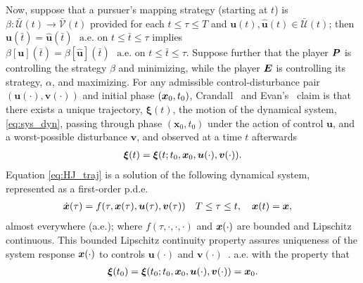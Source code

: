Now, suppose that a pursuer's mapping strategy (starting at $t$) is $\beta: \mathcal{\bar{U}}({t}) \rightarrow \mathcal{\bar{V}}({t})$ provided for each $t \le \tau \le T$ and $\bm{u}(t), \hat{\bm{u}}(t) \in \mathcal{\bar{U}}({t})$; then $\bm{u}(\bar{t}) = \hat{\bm{u}}(\bar{t}) \,\, \text{ a.e. on } t \le \bar{t}  \le \tau$ implies $\beta[\bm{u}](\bar{t}) = \beta[\hat{\bm{u}}](\bar{t}) \,\, \text{ a.e. on } t \le \bar{t}  \le \tau$. Suppose further that the player $\bm{P}$ is controlling the strategy $\beta$ and minimizing, while the player $\bm{E}$ is controlling its strategy, $\alpha$, and maximizing. %
%
For any admissible control-disturbance pair $(\bm{u}(\cdot), \bm{v}(\cdot))$ and initial phase $(\bm{x}_0, t_0)$, Crandall~\cite{Crandall1983viscosity} and Evan's~\cite{Evans1984} claim is that there exists a unique trajectory, $\bm{\xi}(t)$, the motion of the dynamical system, \eqref{eq:sys_dyn}, passing through phase $(\bm{x}_0, t_0)$ under the action of control $\bm{u}$, and a worst-possible disturbance $\bm{v}$, and observed at a time $t$ afterwards \ie
%
\begin{align}
	\bm{\xi}(t) = \bm{\xi}(t; t_0, \bm{x}_0, \bm{u}(\cdot), \bm{v}(\cdot)).
	\label{eq:HJ_traj}
\end{align}
%
Equation \eqref{eq:HJ_traj} is a solution of the following dynamical system, represented as a first-order p.d.e.
%
	\begin{align}
		\dot{\bm{x}}(\tau) &= f(\tau, \bm{x}(\tau), \bm{u}(\tau), \bm{v}(\tau)) \quad T \le \tau \le t, \quad \bm{x}(t) = \bm{x},
		\label{eq:sys_dyn}
	\end{align}
%
\noindent almost everywhere (a.e.); where $f(\tau, \cdot, \cdot, \cdot)$ and $\bm{x}(\cdot)$ are bounded and Lipschitz continuous. This bounded Lipschitz continuity property assures uniqueness of the system response $\bm{x}(\cdot)$ to controls $\bm{u}(\cdot)$ and $\bm{v}(\cdot)$~\cite{Souganidis}. 
%
a.e. with the property that
%
\begin{align}
	\bm{\xi}(t_0) = \bm{\xi}(t_0; t_0, \bm{x}_0, \bm{u}(\cdot), \bm{v}(\cdot)) = \bm{x}_0.
\end{align}

